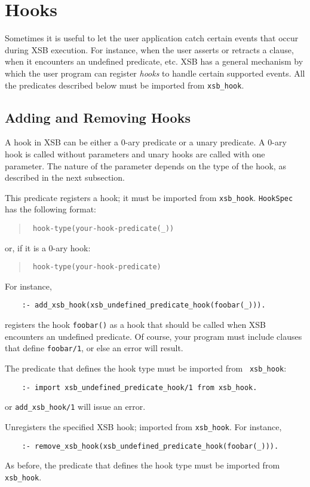 \chapter{Hooks} \label{hooks}

Sometimes it is useful to let the user application catch certain events
that occur during XSB execution. For instance, when the user asserts or
retracts a clause, when it encounters an undefined predicate, etc.
XSB has a general mechanism by which the user program can register
\emph{hooks} to handle certain supported events. All the
predicates described below must be imported from {\tt xsb\_hook}.

\section{Adding and Removing Hooks}

A hook in XSB can be either a 0-ary predicate or a unary predicate.
A 0-ary hook is called without parameters and unary hooks are called with
one parameter. The nature of the parameter depends on the type of the hook,
as described in the next subsection.


\begin{description}
  

This predicate registers a hook; it must be imported from {\tt xsb\_hook}.
{\tt HookSpec} has the following format:
\begin{quote}
 {\tt
   hook-type(your-hook-predicate(\_))
   }
\end{quote}
or, if it is a 0-ary hook:
\begin{quote}
  {\tt
   hook-type(your-hook-predicate)
   }  
\end{quote}
For instance, 
\begin{verbatim}
    :- add_xsb_hook(xsb_undefined_predicate_hook(foobar(_))).
\end{verbatim}
registers the hook {\tt foobar()} as a hook that should be called when XSB
encounters an undefined predicate. Of course, your program must include
clauses that define {\tt foobar/1}, or else an error will result.

The predicate that defines the hook type must be imported from {\tt
  xsb\_hook}:
\begin{verbatim}
    :- import xsb_undefined_predicate_hook/1 from xsb_hook.  
\end{verbatim}
or {\tt add\_xsb\_hook/1} will issue an error.

 

Unregisters the specified XSB hook; imported from {\tt xsb\_hook}. For
instance,
\begin{verbatim}
    :- remove_xsb_hook(xsb_undefined_predicate_hook(foobar(_))).
\end{verbatim}
As before, the predicate that defines the hook type must be imported from
{\tt xsb\_hook}.
\end{description}


